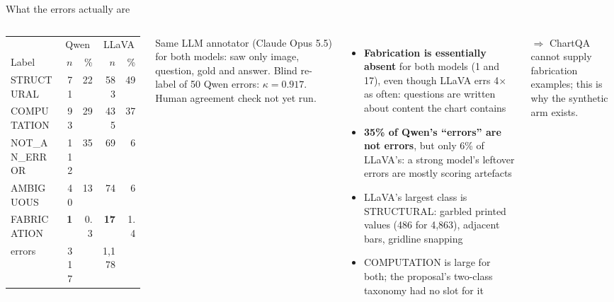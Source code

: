 \documentclass[10pt,aspectratio=169]{beamer}
\newcommand{\cls}[1]{\MakeUppercase{#1}}
\newcommand{\hl}[1]{\alert{\textbf{#1}}}
\begin{document}
\begin{frame}{What the errors actually are}
\small
\begin{columns}[T]
\setlength{\tabcolsep}{4pt}
\begin{tabular}{lrrrr}
\toprule
 & \multicolumn{2}{c}{Qwen} & \multicolumn{2}{c}{LLaVA} \\
Label & $n$ & \% & $n$ & \% \\
\midrule
\cls{structural} & 71 & 22 & 583 & 49 \\
\cls{computation} & 93 & 29 & 435 & 37 \\
\cls{not\_an\_error} & 112 & 35 & 69 & 6 \\
\cls{ambiguous} & 40 & 13 & 74 & 6 \\
\cls{fabrication} & \hl{1} & 0.3 & \hl{17} & 1.4 \\
\midrule
errors & 317 & & 1,178 & \\
\bottomrule
\end{tabular}
\vspace{0.5em}

\footnotesize Same LLM annotator (Claude Opus 5.5) for both models: saw only
image, question, gold and answer. Blind re-label of 50 Qwen errors:
$\kappa=0.917$. Human agreement check not yet run.
\small
\begin{itemize}
\item \hl{Fabrication is essentially absent} for both models (1 and 17), even
though LLaVA errs 4$\times$ as often: questions are written about content the
chart contains
\item \hl{35\% of Qwen's ``errors'' are not errors}, but only 6\% of LLaVA's: a
strong model's leftover errors are mostly scoring artefacts
\item LLaVA's largest class is \cls{structural}: garbled printed values
(486 for 4,863), adjacent bars, gridline snapping
\item \cls{computation} is large for both; the proposal's two-class taxonomy
had no slot for it
\end{itemize}
\vspace{0.3em}
{\footnotesize\raggedright $\Rightarrow$ ChartQA cannot supply fabrication
examples; this is why the synthetic arm exists.\par}
\end{columns}
\end{frame}
\end{document}

